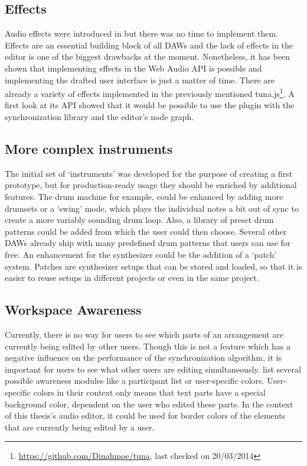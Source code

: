 \subsection{Effects}

Audio effects were introduced in  but there was no time to implement them. Effects are an essential building block of all DAWs and the lack of effects in the editor is one of the biggest drawbacks at the moment. Nonetheless, it has been shown that implementing effects in the Web Audio API is possible and implementing the drafted user interface is just a matter of time. There are already a variety of effects implemented in the previously mentioned tuna.js\footnote{\url{https://github.com/Dinahmoe/tuna}, last checked on 20/03/2014}. A first look at its API showed that it would be possible to use the plugin with the synchronization library and the editor's node graph.

\subsection{More complex instruments}

The initial set of `instruments' was developed for the purpose of creating a first prototype, but for production-ready usage they should be enriched by additional features. The drum machine for example, could be enhanced by adding more drumsets or a `swing' mode, which plays the individual notes a bit out of sync to create a more variably sounding drum loop. Also, a library of preset drum patterns could be added from which the user could then choose. Several other DAWs already ship with many predefined drum patterns that users can use for free. An enhancement for the synthesizer could be the addition of a `patch' system. Patches are synthesizer setups that can be stored and loaded, so that it is easier to reuse setups in different projects or even in the same project.

\subsection{Workspace Awareness}

Currently, there is no way for users to see which parts of an arrangement are currently being edited by other users. Though this is not a feature which has a negative influence on the performance of the synchronization algorithm, it is important for users to see what other users are editing simultaneously. \cite[p. 5f]{koren2013sharedediting} list several possible awareness modules like a participant list or user-specific colors. User-specific colors in their context only means that text parts have a special background color, dependent on the user who edited these parts. In the context of this thesis's audio editor, it could be used for border colors of the elements that are currently being edited by a user.